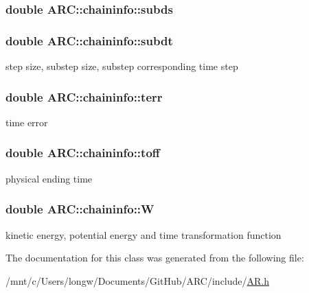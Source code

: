 \subsubsection[{\texorpdfstring{subds}{subds}}]{\setlength{\rightskip}{0pt plus 5cm}double A\+R\+C\+::chaininfo\+::subds}\hypertarget{classARC_1_1chaininfo_a3185aadb946f5d958016a35f40d0341f}{}\label{classARC_1_1chaininfo_a3185aadb946f5d958016a35f40d0341f}
\subsubsection[{\texorpdfstring{subdt}{subdt}}]{\setlength{\rightskip}{0pt plus 5cm}double A\+R\+C\+::chaininfo\+::subdt}\hypertarget{classARC_1_1chaininfo_a470e18cf65e805ff41ea3098da9cdd10}{}\label{classARC_1_1chaininfo_a470e18cf65e805ff41ea3098da9cdd10}


step size, substep size, substep corresponding time step 

\subsubsection[{\texorpdfstring{terr}{terr}}]{\setlength{\rightskip}{0pt plus 5cm}double A\+R\+C\+::chaininfo\+::terr}\hypertarget{classARC_1_1chaininfo_a665c9bc8dfdac9fdee4947e8aaffd8c6}{}\label{classARC_1_1chaininfo_a665c9bc8dfdac9fdee4947e8aaffd8c6}


time error 

\subsubsection[{\texorpdfstring{toff}{toff}}]{\setlength{\rightskip}{0pt plus 5cm}double A\+R\+C\+::chaininfo\+::toff}\hypertarget{classARC_1_1chaininfo_a4c24552fe5d2005171233432f3cf3832}{}\label{classARC_1_1chaininfo_a4c24552fe5d2005171233432f3cf3832}


physical ending time 

\subsubsection[{\texorpdfstring{W}{W}}]{\setlength{\rightskip}{0pt plus 5cm}double A\+R\+C\+::chaininfo\+::W}\hypertarget{classARC_1_1chaininfo_a1072512674fc88001d6cd560a6c7d295}{}\label{classARC_1_1chaininfo_a1072512674fc88001d6cd560a6c7d295}


kinetic energy, potential energy and time transformation function 



The documentation for this class was generated from the following file\+:\begin{DoxyCompactItemize}
\item 
/mnt/c/\+Users/longw/\+Documents/\+Git\+Hub/\+A\+R\+C/include/\hyperlink{AR_8h}{A\+R.\+h}\end{DoxyCompactItemize}
